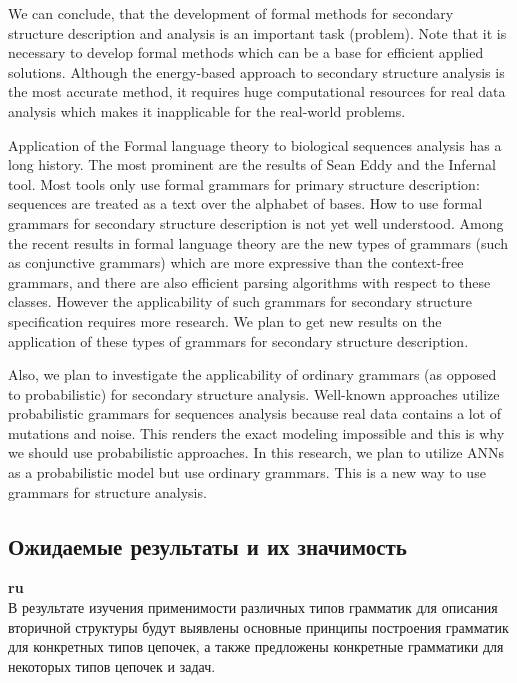 \documentclass[12pt]{article}  %
\theoremstyle{remark}
\begin{document}
We can conclude, that the development of formal methods for secondary structure description and analysis is an important task (problem).
Note that it is necessary to develop formal methods which can be a base for efficient applied solutions.
Although the energy-based approach to secondary structure analysis is the most accurate method, it requires huge computational resources for real data analysis which makes it inapplicable for the real-world problems.

Application of the Formal language theory to biological sequences analysis has a long history. The most prominent are the results of Sean Eddy and the Infernal tool. Most tools only use formal grammars for primary structure description: sequences are treated as a text over the alphabet of bases.
How to use formal grammars for secondary structure description is not yet well understood.
Among the recent results in formal language theory are the new types of grammars (such as conjunctive grammars) which are more expressive than the context-free grammars, and there are also efficient parsing algorithms with respect to these classes.
However the applicability of such grammars for secondary structure specification requires more research.
We plan to get new results on the application of these types of grammars for secondary structure description.

Also, we plan to investigate the applicability of ordinary grammars (as opposed to probabilistic) for secondary structure analysis.
Well-known approaches utilize probabilistic grammars for sequences analysis because real data contains a lot of mutations and noise. This renders the exact modeling impossible and this is why we should use probabilistic approaches.
In this research, we plan to utilize ANNs as a probabilistic model but use ordinary grammars. This is a new way to use grammars for structure analysis.

\subsection{Ожидаемые результаты и их значимость}

\textbf{ru}\\
В результате изучения применимости различных типов грамматик для описания вторичной структуры будут выявлены основные принципы построения грамматик для конкретных типов цепочек, а также предложены конкретные грамматики для некоторых типов цепочек и задач.
\end{document}
